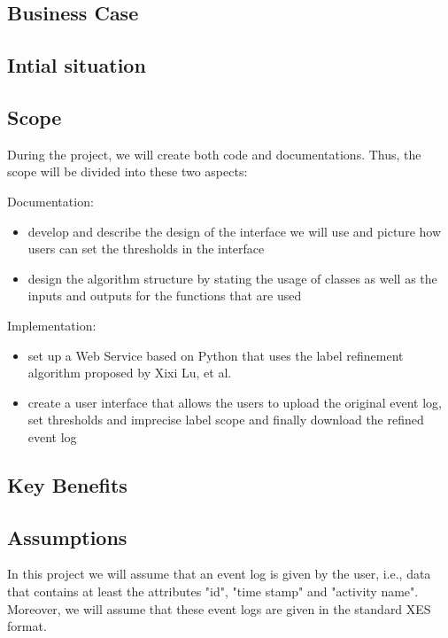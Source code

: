 \documentclass[notitlepage]{article}
\begin{document}
\begin{flushleft}
\section{Business Case}

\subsection{Intial situation}

\subsection{Scope}

During the project, we will create both code and documentations. Thus, the scope will be divided into these two aspects:

Documentation: 
\begin{itemize}
	\item develop and describe the design of the interface we will use and picture how users can set the thresholds in the interface 
	\item design the algorithm structure by stating the usage of classes as well as the inputs and outputs for the functions that are used
	
\end{itemize} 


Implementation:
\begin{itemize}
	\item set up a Web Service based on Python that uses the label refinement algorithm proposed by Xixi Lu, et al.
	\item create a user interface that allows the users to upload the original event log, set thresholds and imprecise label scope and finally download the refined event log
\end{itemize}

\subsection{Key Benefits}

\subsection{Assumptions}

In this project we will assume that an event log is given by the user, i.e., data that contains at least the attributes "id", "time stamp" and "activity name". Moreover, we will assume that these event logs are given in the standard XES format. 


\end{flushleft}
\end{document}
